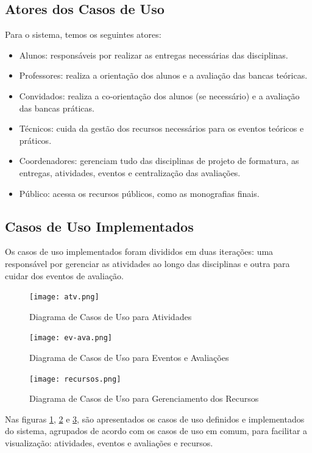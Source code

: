 \subsection{Atores dos Casos de Uso}
Para o sistema, temos os seguintes atores:

\begin{itemize}
    \item Alunos: responsáveis por realizar as entregas necessárias das disciplinas.
    \item Professores: realiza a orientação dos alunos e a avaliação das bancas teóricas.
    \item Convidados: realiza a co-orientação dos alunos (se necessário) e a avaliação das bancas práticas.
    \item Técnicos: cuida da gestão dos recursos necessários para os eventos teóricos e práticos.
    \item Coordenadores: gerenciam tudo das disciplinas de projeto de formatura, as entregas, atividades, eventos e centralização das avaliações.
    \item Público: acessa os recursos públicos, como as monografias finais.
\end{itemize}

\subsection{Casos de Uso Implementados}
Os casos de uso implementados foram divididos em duas iterações: uma responsável por gerenciar as atividades ao longo das disciplinas e outra para cuidar dos eventos de avaliação.

\begin{figure}[H]
    \centering
    \texttt{[image: atv.png]}
    \caption{Diagrama de Casos de Uso para Atividades}
    \label{fig:use-case-atv}
\end{figure}

\begin{figure}[H]
    \centering
    \texttt{[image: ev-ava.png]}
    \caption{Diagrama de Casos de Uso para Eventos e Avaliações}
    \label{fig:use-case-ev-ava}
\end{figure}

\begin{figure}[H]
    \centering
    \texttt{[image: recursos.png]}
    \caption{Diagrama de Casos de Uso para Gerenciamento dos Recursos}
    \label{fig:use-case-recursos}
\end{figure}

Nas figuras \ref{fig:use-case-atv}, \ref{fig:use-case-ev-ava} e \ref{fig:use-case-recursos}, são apresentados os casos de uso definidos e implementados do sistema, agrupados de acordo com os casos de uso em comum, para facilitar a visualização: atividades, eventos e avaliações e recursos. 


